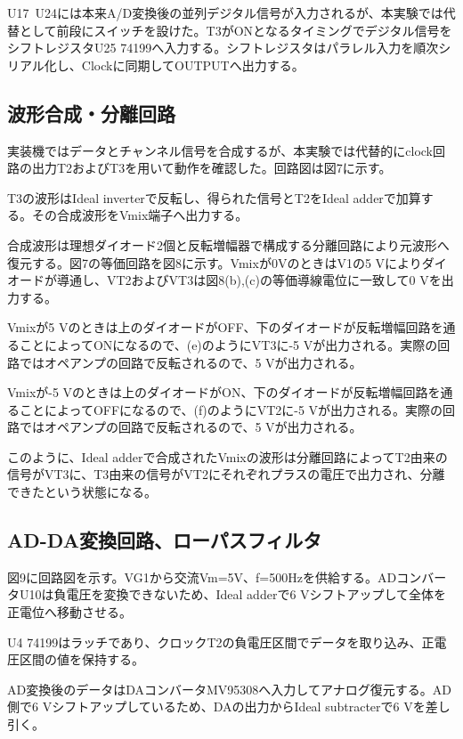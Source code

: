 \documentclass[
  a4paper,
  11pt,
]{ltjsarticle}
\begin{document}
U17~U24には本来A/D変換後の並列デジタル信号が入力されるが、本実験では代替として前段にスイッチを設けた。T3がONとなるタイミングでデジタル信号をシフトレジスタU25 74199へ入力する。シフトレジスタはパラレル入力を順次シリアル化し、Clockに同期してOUTPUTへ出力する。

\subsection{波形合成・分離回路}
実装機ではデータとチャンネル信号を合成するが、本実験では代替的にclock回路の出力T2およびT3を用いて動作を確認した。回路図は図7に示す。

T3の波形はIdeal inverterで反転し、得られた信号とT2をIdeal adderで加算する。その合成波形をVmix端子へ出力する。

合成波形は理想ダイオード2個と反転増幅器で構成する分離回路により元波形へ復元する。図7の等価回路を図8に示す。Vmixが0VのときはV1の5 \si{\volt}によりダイオードが導通し、VT2およびVT3は図8(b),(c)の等価導線電位に一致して0 \si{\volt}を出力する。

Vmixが5 \si{\volt}のときは上のダイオードがOFF、下のダイオードが反転増幅回路を通ることによってONになるので、(e)のようにVT3に-5 \si{\volt}が出力される。実際の回路ではオペアンプの回路で反転されるので、5 \si{\volt}が出力される。

Vmixが-5 \si{\volt}のときは上のダイオードがON、下のダイオードが反転増幅回路を通ることによってOFFになるので、(f)のようにVT2に-5 \si{\volt}が出力される。実際の回路ではオペアンプの回路で反転されるので、5 \si{\volt}が出力される。

このように、Ideal adderで合成されたVmixの波形は分離回路によってT2由来の信号がVT3に、T3由来の信号がVT2にそれぞれプラスの電圧で出力され、分離できたという状態になる。

\subsection{AD-DA変換回路、ローパスフィルタ}
図9に回路図を示す。VG1から交流Vm=5V、f=500Hzを供給する。ADコンバータU10は負電圧を変換できないため、Ideal adderで6 Vシフトアップして全体を正電位へ移動させる。

U4 74199はラッチであり、クロックT2の負電圧区間でデータを取り込み、正電圧区間の値を保持する。

AD変換後のデータはDAコンバータMV95308へ入力してアナログ復元する。AD側で6 Vシフトアップしているため、DAの出力からIdeal subtracterで6 Vを差し引く。
\end{document}

